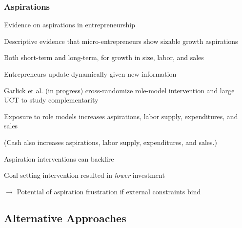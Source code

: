 \documentclass[hideothersubsections, usenames,dvipsnames,11pt]{beamer}
\newenvironment{itemize_2pt}{\itemize\addtolength{\itemsep}{2pt}}{\enditemize}
\begin{document}
\begin{frame}
\frametitle{Aspirations}

Evidence on aspirations in entrepreneurship
\begin{itemize_2pt}
	\item Descriptive evidence that \textcolor{bdf}{micro-entrepreneurs show sizable growth aspirations} \citep{Dalton2018}
	\begin{itemize_2pt}
		\item Both short-term and long-term, for growth in size, labor, and sales
		\item Entrepreneurs update dynamically given new information
	\end{itemize_2pt}
	
	\pause
	
	\item \href{https://www.poverty-action.org/study/impact-cash-transfers-aspirations-and-goal-setting-economic-outcomes-and-well-being}{Garlick et al. (in progress)} cross-randomize role-model intervention and large UCT to study complementarity
	\begin{itemize_2pt}
		\item \textcolor{bdf}{Exposure to role models increases aspirations, labor supply, expenditures, and sales}
		\item[] (Cash also increases aspirations, labor supply, expenditures, and sales.)
	\end{itemize_2pt}
	
	\pause
	
	\item \textcolor{bdf}{Aspiration interventions can backfire}
	\begin{itemize_2pt}
		\item Goal setting intervention resulted in \textit{lower} investment \citep{McKenzie2021a}
		\item[] $\rightarrow$ Potential of aspiration frustration if external constraints bind 
		\item[] \quad \citep[see also,][]{Galiani2018}
	\end{itemize_2pt}

\end{itemize_2pt}
\end{frame}


\subsection{Alternative Approaches}
\end{document}
